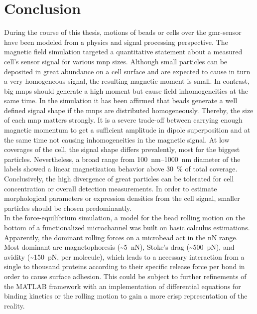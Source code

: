 \chapter{Conclusion}
During the course of this thesis, motions of beads or cells over the \gls{gmr}-sensor have been modeled from a physics and signal processing perspective. The magnetic field simulation targeted a quantitative statement about a measured cell's sensor signal for various \gls{mnp} sizes. Although small particles can be deposited in great abundance on a cell surface and are expected to cause in turn a very homogeneous signal, the resulting magnetic moment is small. In contrast, big \glspl{mnp} should generate a high moment but cause field inhomogeneities at the same time.  In the simulation it has been affirmed that beads generate a well defined signal shape if the \glspl{mnp} are distributed homogeneously. Thereby, the size of each \gls{mnp} matters strongly. It is a severe trade-off between carrying enough magnetic momentum to get a sufficient amplitude in dipole superposition and at the same time not causing inhomogeneities in the magnetic signal. At low coverages of the cell, the signal shape differs prevalently, most for the biggest particles. Nevertheless, a broad range from \SIrange{100}{1000}{\nano\meter} diameter of the labels showed a linear magnetization behavior above \SI{30}{\percent} of total coverage. Conclusively, the high divergence of great particles can be tolerated for cell concentration or overall detection measurements. In order to estimate morphological parameters or expression densities from the cell signal, smaller particles should be chosen predominantly. \\

In the force-equilibrium simulation, a model for the bead rolling motion on the bottom of a functionalized microchannel was built on basic calculus estimations. Apparently, the dominant rolling forces on a microbead act in the \si{\nano\newton} range. Most dominant are magnetophoresis (\textasciitilde\SI{5}{\nano\newton}), Stoke's drag (\textasciitilde\SI{500}{\pico\newton}), and avidity (\textasciitilde\SI{150}{\pico\newton}, per molecule), which leads to a necessary interaction from a single to thousand proteins according to their specific release force per bond in order to cause surface adhesion. This could be subject to further refinements of the MATLAB framework with an implementation of differential equations for binding kinetics \cite{lit:bio:BindingModeling} or the rolling motion to gain a more crisp representation of the reality. 


